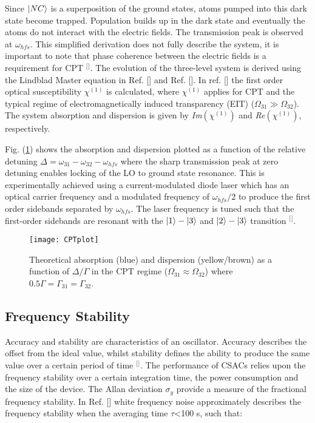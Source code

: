 Since $\lvert NC\rangle$ is a superposition of the ground states, atoms pumped into this dark state become trapped. Population builds up in the dark state and eventually the atoms do not interact with the electric fields. The  transmission peak is observed at $\omega_{hfs}$. This simplified derivation does not fully describe the system, it is important to note that phase coherence between the electric fields is a requirement for CPT $^[$\citep{Khan2017CoherentEIT}$^]$. The evolution of the three-level system is derived using the Lindblad Master equation in Ref. [] and Ref. []. In ref. [] the first order optical susceptibility $\chi^{(1)}$ is calculated, where $\chi^{(1)}$ applies for CPT and the typical regime of electromagnetically induced transparency (EIT) ($\Omega_{31}\gg \Omega_{32}$). The system absorption and dispersion is given by \textit{Im}$(\chi^{(1)})$ and \textit{Re}$(\chi^{(1)})$, respectively. 


Fig. (\ref{fig:CPTplot}) shows the absorption and dispersion plotted as a function of the relative detuning $\Delta=\omega_{31}-\omega_{32}-\omega_{hfs}$ where the sharp transmission peak at zero detuning enables locking of the LO to ground state resonance. This is experimentally achieved using a current-modulated diode laser which has an optical carrier frequency and a modulated frequency of $\omega_{hfs}/2$ to produce the first order sidebands separated by $\omega_{hfs}$. The laser frequency is tuned such that the first-order sidebands are resonant with the $\lvert1\rangle-\lvert3\rangle$ and $\lvert2\rangle-\lvert3\rangle$ transition $^[$\citep{Lutwak2002TheInterrogation}$^]$. 

\begin{figure}[t]
\centering
\texttt{[image: CPTplot]}
\caption{\label{fig:CPTplot}Theoretical absorption (blue) and dispersion (yellow/brown) as a function of $\Delta/\Gamma$ in the CPT regime ($\Omega_{31}\approx\Omega_{32}$) where $0.5\Gamma=\Gamma_{31}=\Gamma_{32}$.}
\end{figure}


\subsection{Frequency Stability}
Accuracy and stability are characteristics of an oscillator. Accuracy describes the offset from the ideal value, whilst stability defines the ability to produce the same value over a certain period of time $^[$\citep{Lombardi2001AnCalibrations}$^]$. The performance of CSACs relies upon the frequency stability over a certain integration time, the power consumption and the size of the device. The Allan deviation $\sigma_{y}$ provide a measure of the fractional frequency stability. In Ref. [] white frequency noise approximately describes the frequency stability when the averaging time $\tau$<100 s, such that:

